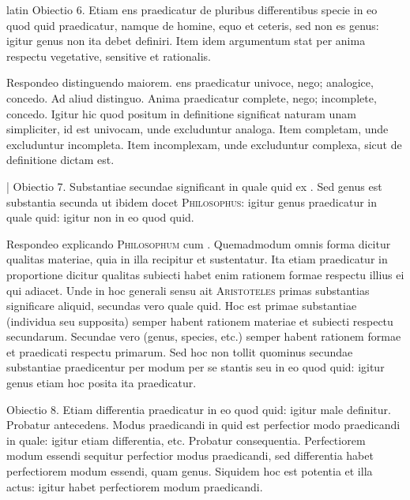 \begin{otherlanguage*}{latin}
\pstart
  Obiectio 6. Etiam ens praedicatur de pluribus differentibus specie in eo quod quid praedicatur, namque de homine, equo et ceteris, sed non es genus: igitur genus non ita debet definiri. Item idem argumentum stat per anima respectu vegetative, sensitive et rationalis. 
\pend

\pstart
  Respondeo distinguendo maiorem. ens praedicatur univoce, nego; analogice, concedo. Ad aliud distinguo. Anima praedicatur complete, nego; incomplete, concedo. Igitur hic quod positum in definitione significat naturam unam simpliciter, id est univocam, unde excluduntur analoga. Item completam, unde excluduntur incompleta. Item incomplexam, unde excluduntur complexa, sicut de definitione dictam est. 
\pend

\pstart
  \textnormal{|}   Obiectio 7. Substantiae secundae significant in quale quid ex . Sed genus est substantia secunda ut ibidem docet \textsc{Philosophus}: igitur genus praedicatur in quale quid: igitur non in eo quod quid. 
\pend

\pstart
  Respondeo explicando \textsc{Philosophum} cum . Quemadmodum omnis forma dicitur qualitas materiae, quia in illa recipitur et sustentatur. Ita etiam praedicatur in proportione dicitur qualitas subiecti habet enim rationem formae respectu illius ei qui adiacet. Unde in hoc generali sensu ait \textsc{Aristoteles} primas substantias significare aliquid, secundas vero quale quid. Hoc est primae substantiae (individua seu supposita) semper habent rationem materiae et subiecti respectu secundarum. Secundae vero (genus, species, etc.) semper habent rationem formae et praedicati respectu primarum. Sed hoc non tollit quominus secundae substantiae praedicentur per modum per se stantis seu in eo quod quid: igitur genus etiam hoc posita ita praedicatur. 
\pend

\pstart
  Obiectio 8. Etiam differentia praedicatur in eo quod quid: igitur male definitur. Probatur antecedens. Modus praedicandi in quid est perfectior modo praedicandi in quale: igitur etiam differentia, etc. Probatur consequentia. Perfectiorem modum essendi sequitur perfectior modus praedicandi, sed differentia habet perfectiorem modum essendi, quam genus. Siquidem hoc est potentia et illa actus: igitur habet perfectiorem modum praedicandi. 
\pend


\end{otherlanguage*}
